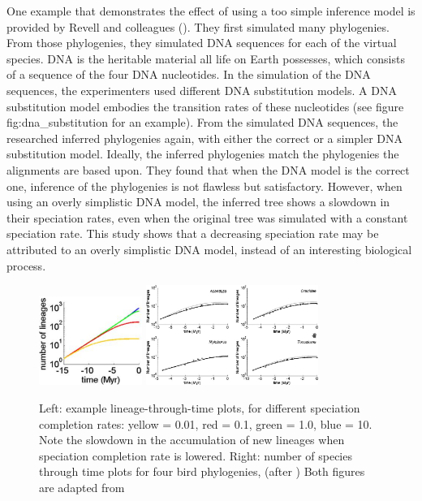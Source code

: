 One example that demonstrates the effect of using a too simple inference model
is provided by Revell and colleagues (\cite{revell2005under}).
They first simulated many phylogenies.
From those phylogenies, they simulated DNA sequences for each of
the virtual species.
DNA is the heritable material all life on Earth possesses,
which consists of a sequence of the four DNA nucleotides.
In the simulation of the DNA sequences, the experimenters
used different DNA substitution models.
A DNA substitution model embodies the transition rates of these nucleotides (see
figure {fig:dna_substitution} for an example).
From the simulated DNA sequences, the researched inferred phylogenies again,
with either the correct or a simpler DNA substitution model.
Ideally, the inferred phylogenies match the phylogenies the alignments are based upon.
They found that when the DNA model is the correct one, inference of the
phylogenies is not flawless but satisfactory.
However, when using an overly simplistic DNA model, 
the inferred tree shows a slowdown in their speciation rates, 
even when the original tree was simulated with a constant speciation rate.
This study shows that a decreasing speciation rate may be attributed
to an overly simplistic DNA model, instead of an interesting biological process.


\begin{figure}[H]

  \includegraphics[width=0.3\textwidth]{etienne_rosindell_2011_ltt.png}
  \includegraphics[width=0.5\textwidth]{etienne_rosindell_2011.png}
  \caption{
    Left: example lineage-through-time plots, for different 
    speciation completion rates: yellow = 0.01, red = 0.1, green = 1.0, blue = 10.
    Note the slowdown in the accumulation of new lineages when speciation completion
    rate is lowered.
    Right: number of species through time plots for four bird phylogenies, 
    (after \cite{phillimore2008density})
    Both figures are adapted from \cite{etienne2012prolonging}
 }
  \label{fig:etienne2012prolonging}
\end{figure}

